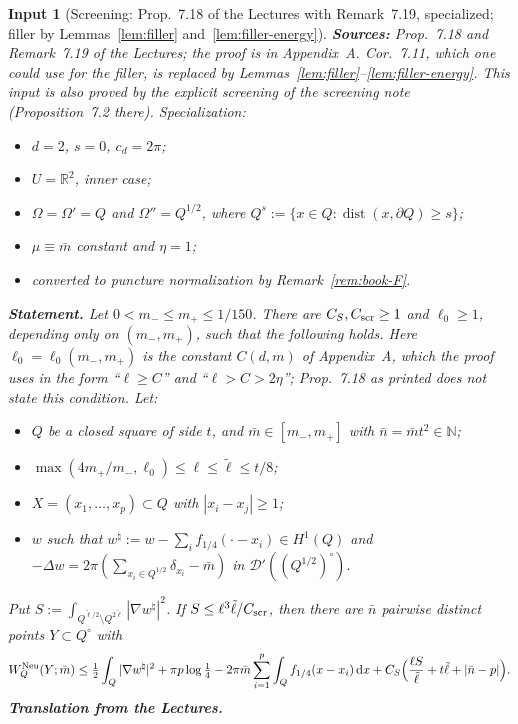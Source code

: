 \documentclass[11pt]{article}
\newtheorem{citedinput}[theorem]{Input}
\theoremstyle{definition}
\theoremstyle{remark}
\newcommand{\R}{\mathbb R}
\newcommand{\N}{\mathbb N}
\newcommand{\dd}{\,\mathrm d}
\begin{document}
\begin{citedinput}[Screening: Prop.~7.18 of the Lectures with Remark~7.19, specialized; filler by Lemmas~\ref{lem:filler} and~\ref{lem:filler-energy}]\label{in:SCR}
\textbf{Sources:} Prop.~7.18 and Remark~7.19 of the Lectures; the proof is in Appendix~A. Cor.~7.11, which one could use for the
filler, is replaced by Lemmas~\ref{lem:filler}--\ref{lem:filler-energy}. This input is also proved by the explicit screening
of the screening note (Proposition~7.2 there). Specialization:
\begin{itemize}[leftmargin=*]
\item $d=2$, $s=0$, $c_d=2\pi$;
\item $U=\R^2$, inner case;
\item $\Omega=\Omega'=Q$ and $\Omega''=Q^{1/2}$, where $Q^{s}:=\{x\in Q:\operatorname{dist}(x,\partial Q)\ge s\}$;
\item $\mu\equiv\bar m$ constant and $\eta=1$;
\item converted to puncture normalization by Remark~\ref{rem:book-F}.
\end{itemize}
\textbf{Statement.} Let $0<m_-\le m_+\le1/150$. There are $C_S,C_{\rm scr}\ge1$ and $\ell_0\ge1$,
depending only on $(m_-,m_+)$, such that the following holds. Here $\ell_0=\ell_0(m_-,m_+)$ is the
constant $C(d,m)$ of Appendix~A, which the proof uses in the form ``$\ell\ge C$'' and ``$\ell>C>2\eta$'';
Prop.~7.18 as printed does not state
this condition. Let:
\begin{itemize}[leftmargin=*]
\item $Q$ be a closed square of side $t$, and $\bar m\in[m_-,m_+]$ with $\bar n=\bar mt^2\in\N$;
\item $\max(4m_+/m_-,\ell_0)\le\ell\le\tilde\ell\le t/8$;
\item $X=(x_1,\dots,x_p)\subset Q$ with $|x_i-x_j|\ge1$;
\item $w$ such that $w^\natural:=w-\sum_if_{1/4}(\cdot-x_i)\in H^1(Q)$ and
  $-\Delta w=2\pi(\sum_{x_i\in Q^{1/2}}\delta_{x_i}-\bar m)$ in $\mathcal D'((Q^{1/2})^\circ)$.
\end{itemize}
Put $S:=\int_{Q^{\tilde\ell/2}\setminus Q^{2\tilde\ell}}|\nabla w^\natural|^2$. If
$S\le\ell^3\tilde\ell/C_{\rm scr}$, then there are $\bar n$ pairwise distinct points
$Y\subset Q^\circ$ with
\[
W^{\rm Neu}_Q(Y;\bar m)\le\tfrac12\int_Q|\nabla w^\natural|^2+\pi p\log\tfrac14
-2\pi\bar m\sum_{i=1}^p\int_Qf_{1/4}(x-x_i)\dd x
+C_S\Bigl(\frac{\ell S}{\tilde\ell}+t\tilde\ell+|\bar n-p|\Bigr).
\]
\textbf{Translation from the Lectures.}
\begin{itemize}[leftmargin=*]

\end{itemize}
\end{citedinput}
\end{document}
